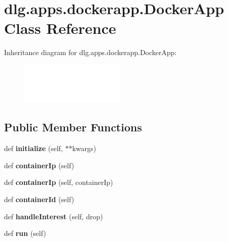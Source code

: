 \hypertarget{classdlg_1_1apps_1_1dockerapp_1_1_docker_app}{}\section{dlg.\+apps.\+dockerapp.\+Docker\+App Class Reference}
\label{classdlg_1_1apps_1_1dockerapp_1_1_docker_app}
Inheritance diagram for dlg.\+apps.\+dockerapp.\+Docker\+App\+:\begin{figure}[H]
\begin{center}
\leavevmode
\includegraphics[height=2.000000cm]{classdlg_1_1apps_1_1dockerapp_1_1_docker_app}
\end{center}
\end{figure}
\subsection*{Public Member Functions}
\begin{DoxyCompactItemize}
\item 
\mbox{\label{classdlg_1_1apps_1_1dockerapp_1_1_docker_app_a9fe5578f49cd8f820c9f54fa03d0628e}} 
def {\bfseries initialize} (self, $\ast$$\ast$kwargs)
\item 
\mbox{\label{classdlg_1_1apps_1_1dockerapp_1_1_docker_app_a75d89b4cf076666087d2376e6d263c76}} 
def {\bfseries container\+Ip} (self)
\item 
\mbox{\label{classdlg_1_1apps_1_1dockerapp_1_1_docker_app_a220a96d23369c300f5ea5ea9984f672b}} 
def {\bfseries container\+Ip} (self, container\+Ip)
\item 
\mbox{\label{classdlg_1_1apps_1_1dockerapp_1_1_docker_app_a84c7e6147d7f8879e25c1d310a0b30e1}} 
def {\bfseries container\+Id} (self)
\item 
\mbox{\label{classdlg_1_1apps_1_1dockerapp_1_1_docker_app_a584c9c33acc2ed12e02571c04b06f844}} 
def {\bfseries handle\+Interest} (self, drop)
\item 
\mbox{\label{classdlg_1_1apps_1_1dockerapp_1_1_docker_app_a0b43fc109e7140231be6669b3a7600f4}} 
def {\bfseries run} (self)
\end{DoxyCompactItemize}
